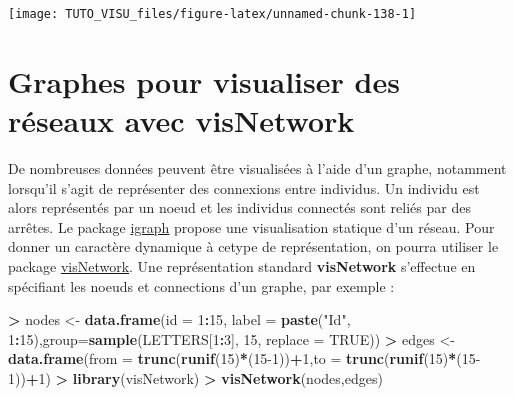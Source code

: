 \documentclass[]{book}
\newenvironment{Shaded}{\begin{snugshade}}{\end{snugshade}}
\newcommand{\DataTypeTok}[1]{\textcolor[rgb]{0.13,0.29,0.53}{#1}}
\newcommand{\DecValTok}[1]{\textcolor[rgb]{0.00,0.00,0.81}{#1}}
\newcommand{\KeywordTok}[1]{\textcolor[rgb]{0.13,0.29,0.53}{\textbf{#1}}}
\newcommand{\NormalTok}[1]{#1}
\newcommand{\OperatorTok}[1]{\textcolor[rgb]{0.81,0.36,0.00}{\textbf{#1}}}
\newcommand{\OtherTok}[1]{\textcolor[rgb]{0.56,0.35,0.01}{#1}}
\newcommand{\StringTok}[1]{\textcolor[rgb]{0.31,0.60,0.02}{#1}}
\theoremstyle{definition}
\theoremstyle{definition}
\theoremstyle{definition}
\theoremstyle{remark}
\begin{document}
\begin{center}\texttt{[image: TUTO\_VISU\_files/figure-latex/unnamed-chunk-138-1]} \end{center}

\hypertarget{graphes-pour-visualiser-des-ruxe9seaux-avec-visnetwork}{%
\section{Graphes pour visualiser des réseaux avec visNetwork}\label{graphes-pour-visualiser-des-ruxe9seaux-avec-visnetwork}}

De nombreuses données peuvent être visualisées à l'aide d'un graphe, notamment lorsqu'il s'agit de représenter des connexions entre individus. Un individu est alors représentés par un noeud et les individus connectés sont reliés par des arrêtes. Le package \href{http://kateto.net/networks-r-igraph}{igraph} propose une visualisation statique d'un réseau. Pour donner un caractère dynamique à cetype de représentation, on pourra utiliser le package \href{https://datastorm-open.github.io/visNetwork/interaction.html}{visNetwork}. Une représentation standard \textbf{visNetwork} s'effectue en spécifiant les noeuds et connections d'un graphe, par exemple :

\begin{Shaded}
\begin{Highlighting}[]
\OperatorTok{>}\StringTok{ }\NormalTok{nodes <-}\StringTok{ }\KeywordTok{data.frame}\NormalTok{(}\DataTypeTok{id =} \DecValTok{1}\OperatorTok{:}\DecValTok{15}\NormalTok{, }\DataTypeTok{label =} \KeywordTok{paste}\NormalTok{(}\StringTok{"Id"}\NormalTok{, }\DecValTok{1}\OperatorTok{:}\DecValTok{15}\NormalTok{),}\DataTypeTok{group=}\KeywordTok{sample}\NormalTok{(LETTERS[}\DecValTok{1}\OperatorTok{:}\DecValTok{3}\NormalTok{], }\DecValTok{15}\NormalTok{, }\DataTypeTok{replace =} \OtherTok{TRUE}\NormalTok{))}
\OperatorTok{>}\StringTok{ }\NormalTok{edges <-}\StringTok{ }\KeywordTok{data.frame}\NormalTok{(}\DataTypeTok{from =} \KeywordTok{trunc}\NormalTok{(}\KeywordTok{runif}\NormalTok{(}\DecValTok{15}\NormalTok{)}\OperatorTok{*}\NormalTok{(}\DecValTok{15-1}\NormalTok{))}\OperatorTok{+}\DecValTok{1}\NormalTok{,}\DataTypeTok{to =} \KeywordTok{trunc}\NormalTok{(}\KeywordTok{runif}\NormalTok{(}\DecValTok{15}\NormalTok{)}\OperatorTok{*}\NormalTok{(}\DecValTok{15-1}\NormalTok{))}\OperatorTok{+}\DecValTok{1}\NormalTok{)}
\OperatorTok{>}\StringTok{ }\KeywordTok{library}\NormalTok{(visNetwork)}
\OperatorTok{>}\StringTok{ }\KeywordTok{visNetwork}\NormalTok{(nodes,edges)}
\end{Highlighting}
\end{Shaded}
\end{document}
